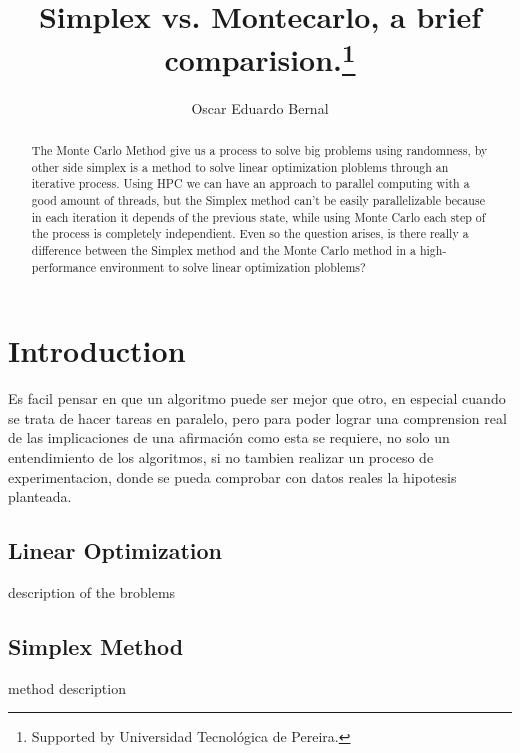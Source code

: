 \documentclass[runningheads]{llncs}
\begin{document}
%
\title{Simplex vs. Montecarlo, a brief comparision.\thanks{Supported by Universidad Tecnológica de Pereira.}}
%
%
\author{Oscar Eduardo Bernal}
%
%
%
\maketitle              %
%
\begin{abstract}
The Monte Carlo Method give us a process to solve big problems using randomness, by other side simplex is a method to solve linear optimization ploblems through an iterative process. Using HPC we can have an approach to parallel computing with a good amount of threads, but the Simplex method can't be easily parallelizable because in each iteration it depends of the previous state, while using Monte Carlo each step of the process is completely independient. Even so the question arises, is there really a difference between the Simplex method and the Monte Carlo method in a high-performance environment to solve linear optimization ploblems?

\end{abstract}
%
%
%
\section{Introduction}
Es facil pensar en que un algoritmo puede ser mejor que otro, en especial cuando se trata de hacer tareas en paralelo, pero para poder lograr una comprension real de las implicaciones de una afirmación como esta se requiere, no solo un entendimiento de los algoritmos, si no tambien realizar un proceso de experimentacion, donde se pueda comprobar con datos reales la hipotesis planteada.

\subsection{Linear Optimization}
description of the broblems

\subsection{Simplex Method}
method description
\end{document}
